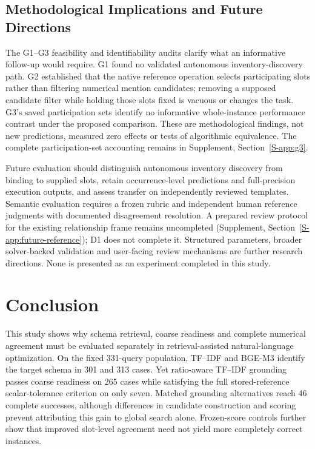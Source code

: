 \documentclass[pdflatex,sn-basic,Numbered]{sn-jnl}
\begin{document}
\subsection{Methodological Implications and Future Directions}
\label{subsec:future_work}\label{subsec:closed-audits}
The G1--G3 feasibility and identifiability audits clarify what an informative follow-up would require. G1 found no validated autonomous inventory-discovery path. G2 established that the native reference operation selects participating slots rather than filtering numerical mention candidates; removing a supposed candidate filter while holding those slots fixed is vacuous or changes the task. G3's saved participation sets identify no informative whole-instance performance contrast under the proposed comparison. These are methodological findings, not new predictions, measured zero effects or tests of algorithmic equivalence. The complete participation-set accounting remains in Supplement, Section~\ref{S-app:g3}.

Future evaluation should distinguish autonomous inventory discovery from binding to supplied slots, retain occurrence-level predictions and full-precision execution outputs, and assess transfer on independently reviewed templates. Semantic evaluation requires a frozen rubric and independent human reference judgments with documented disagreement resolution. A prepared review protocol for the existing relationship frame remains uncompleted (Supplement, Section~\ref{S-app:future-reference}); D1 does not complete it. Structured parameters, broader solver-backed validation and user-facing review mechanisms are further research directions. None is presented as an experiment completed in this study.

\section{Conclusion}
\label{sec:conclusion}
This study shows why schema retrieval, coarse readiness and complete numerical agreement must be evaluated separately in retrieval-assisted natural-language optimization. On the fixed 331-query population, TF--IDF and BGE-M3 identify the target schema in 301 and 313 cases. Yet ratio-aware TF--IDF grounding passes coarse readiness on 265 cases while satisfying the full stored-reference scalar-tolerance criterion on only seven. Matched grounding alternatives reach 46 complete successes, although differences in candidate construction and scoring prevent attributing this gain to global search alone. Frozen-score controls further show that improved slot-level agreement need not yield more completely correct instances.
\end{document}
